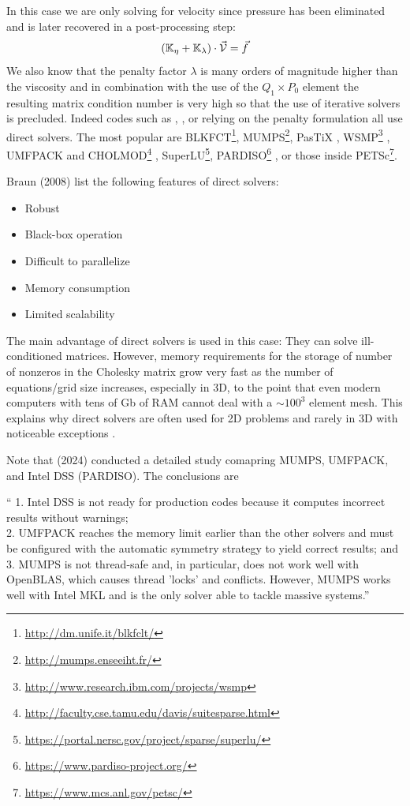 In this case we are only solving for 
velocity since pressure has been eliminated and is later recovered in a post-processing step:
\[
({\mathbb{K}}_\eta+{\mathbb{K}}_\lambda) \cdot \vec {\cal V} = \vec f
\]
 We also know that 
the penalty factor $\lambda$ is many orders of magnitude higher than the viscosity and 
in combination with the use of the $Q_1 \times P_0$ element the resulting matrix 
condition number is very high so that the use of iterative solvers is precluded. 
Indeed codes such as \sopale \cite{full95}, \douar \cite{brtf08}, \fantom \cite{thie11} 
or \sulec \cite{qube11} relying on the penalty formulation all use direct solvers.
The most popular are BLKFCT\footnote{\url{http://dm.unife.it/blkfclt/}}, 
MUMPS\footnote{\url{http://mumps.enseeiht.fr/}}\cite{amdu89,amdl00,amdk01,amgl06,ambl19}, 
PasTiX \cite{herr02},
WSMP\footnote{\url{http://www.research.ibm.com/projects/wsmp}} \cite{GUPTA94ieee,GUPTA09sc-long},
UMFPACK and CHOLMOD\footnote{\url{http://faculty.cse.tamu.edu/davis/suitesparse.html}}
, SuperLU\footnote{\url{https://portal.nersc.gov/project/sparse/superlu/}}, 
PARDISO\footnote{\url{https://www.pardiso-project.org/}}
\cite{pardiso-6.0a,pardiso-6.0b,pardiso-6.0c}, or those inside 
PETSc\footnote{\url{https://www.mcs.anl.gov/petsc/}}.

Braun \etal (2008) \cite{brtf08} list the following features of direct solvers:
\begin{itemize}
\item Robust
\item Black-box operation
\item Difficult to parallelize
\item Memory consumption
\item Limited scalability
\end{itemize}

The main advantage of direct solvers is used in this case: They can solve ill-conditioned 
matrices. However, memory requirements for the storage of number of nonzeros in the 
Cholesky matrix grow very fast as the number of equations/grid size increases, especially in 3D,
to the point that even modern computers with tens of Gb of RAM cannot deal with a $\sim 100^3$ element mesh.
This explains why direct solvers are often used for 2D problems and rarely in 3D with noticeable 
exceptions \cite{thfb08,yahb09,brya10,lobh10,alht11,alht12,alhf13,whbb14,neew18}. 

Note that \textcite{pedr24} (2024) conducted a detailed study comapring 
MUMPS, UMFPACK, and Intel DSS (PARDISO).
The conclusions are 
\begin{displayquote}
``
1. Intel DSS is not ready for production codes because it computes incorrect results without warnings;\\
2. UMFPACK reaches the memory limit earlier than the other solvers and must be configured with the automatic
symmetry strategy to yield correct results; and\\
3. MUMPS is not thread-safe and, in particular, does not work well with OpenBLAS, which causes thread 'locks' and
conflicts. However, MUMPS works well with Intel MKL and is the only solver able to tackle massive systems.''
\end{displayquote}


